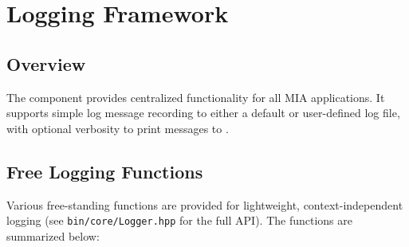 \section{Logging Framework}\label{section:logging_Framework}

\subsection{Overview}
The  component provides centralized  functionality for all MIA applications. It supports simple log message recording to either a default or user-defined log file, with optional verbosity to print messages to .

\subsection{Free Logging Functions}
Various free-standing functions are provided for lightweight, context-independent logging (see \texttt{bin/core/Logger.hpp} for the full API). The functions are summarized below:

